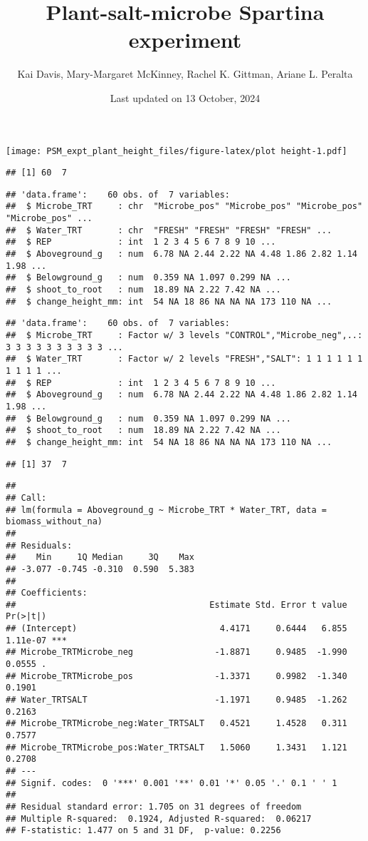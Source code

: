 \documentclass[
]{article}
\title{Plant-salt-microbe Spartina experiment}
\author{Kai Davis, Mary-Margaret McKinney, Rachel K. Gittman, Ariane L.
Peralta}
\date{Last updated on 13 October, 2024}
\begin{document}
\maketitle

\texttt{[image: PSM\_expt\_plant\_height\_files/figure-latex/plot height-1.pdf]}

\begin{verbatim}
## [1] 60  7
\end{verbatim}

\begin{verbatim}
## 'data.frame':    60 obs. of  7 variables:
##  $ Microbe_TRT     : chr  "Microbe_pos" "Microbe_pos" "Microbe_pos" "Microbe_pos" ...
##  $ Water_TRT       : chr  "FRESH" "FRESH" "FRESH" "FRESH" ...
##  $ REP             : int  1 2 3 4 5 6 7 8 9 10 ...
##  $ Aboveground_g   : num  6.78 NA 2.44 2.22 NA 4.48 1.86 2.82 1.14 1.98 ...
##  $ Belowground_g   : num  0.359 NA 1.097 0.299 NA ...
##  $ shoot_to_root   : num  18.89 NA 2.22 7.42 NA ...
##  $ change_height_mm: int  54 NA 18 86 NA NA NA 173 110 NA ...
\end{verbatim}

\begin{verbatim}
## 'data.frame':    60 obs. of  7 variables:
##  $ Microbe_TRT     : Factor w/ 3 levels "CONTROL","Microbe_neg",..: 3 3 3 3 3 3 3 3 3 3 ...
##  $ Water_TRT       : Factor w/ 2 levels "FRESH","SALT": 1 1 1 1 1 1 1 1 1 1 ...
##  $ REP             : int  1 2 3 4 5 6 7 8 9 10 ...
##  $ Aboveground_g   : num  6.78 NA 2.44 2.22 NA 4.48 1.86 2.82 1.14 1.98 ...
##  $ Belowground_g   : num  0.359 NA 1.097 0.299 NA ...
##  $ shoot_to_root   : num  18.89 NA 2.22 7.42 NA ...
##  $ change_height_mm: int  54 NA 18 86 NA NA NA 173 110 NA ...
\end{verbatim}

\begin{verbatim}
## [1] 37  7
\end{verbatim}

\begin{verbatim}
## 
## Call:
## lm(formula = Aboveground_g ~ Microbe_TRT * Water_TRT, data = biomass_without_na)
## 
## Residuals:
##    Min     1Q Median     3Q    Max 
## -3.077 -0.745 -0.310  0.590  5.383 
## 
## Coefficients:
##                                      Estimate Std. Error t value Pr(>|t|)    
## (Intercept)                            4.4171     0.6444   6.855 1.11e-07 ***
## Microbe_TRTMicrobe_neg                -1.8871     0.9485  -1.990   0.0555 .  
## Microbe_TRTMicrobe_pos                -1.3371     0.9982  -1.340   0.1901    
## Water_TRTSALT                         -1.1971     0.9485  -1.262   0.2163    
## Microbe_TRTMicrobe_neg:Water_TRTSALT   0.4521     1.4528   0.311   0.7577    
## Microbe_TRTMicrobe_pos:Water_TRTSALT   1.5060     1.3431   1.121   0.2708    
## ---
## Signif. codes:  0 '***' 0.001 '**' 0.01 '*' 0.05 '.' 0.1 ' ' 1
## 
## Residual standard error: 1.705 on 31 degrees of freedom
## Multiple R-squared:  0.1924, Adjusted R-squared:  0.06217 
## F-statistic: 1.477 on 5 and 31 DF,  p-value: 0.2256
\end{verbatim}
\end{document}

